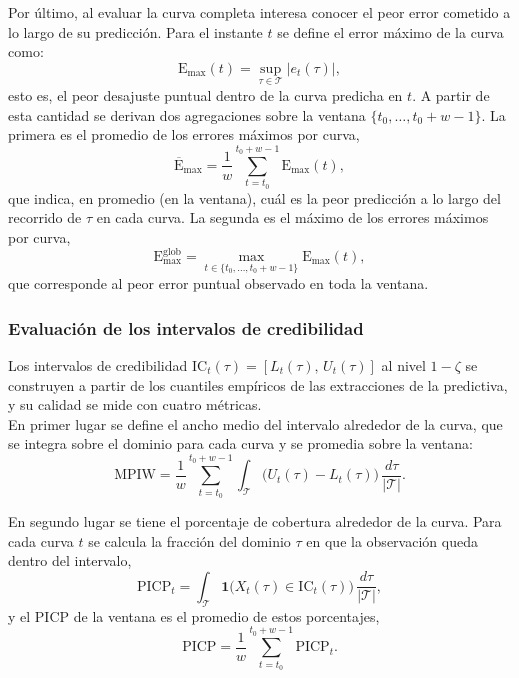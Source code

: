 Por último, al evaluar la curva completa interesa conocer el peor error cometido a lo largo de su predicción. Para el instante $t$ se define el error máximo de la curva como:
\begin{equation}
    \mathrm{E}_{\max}(t) = \sup_{\tau \in \mathcal{T}} \bigl|e_{t}(\tau)\bigr|,
\end{equation}
esto es, el peor desajuste puntual dentro de la curva predicha en $t$. A partir de esta cantidad se derivan dos agregaciones sobre la ventana $\{t_0, \dots, t_0+w-1\}$. La primera es el promedio de los errores máximos por curva,
\begin{equation}
    \overline{\mathrm{E}}_{\max} = \frac{1}{w}\sum_{t=t_0}^{t_0+w-1}
    \mathrm{E}_{\max}(t),
\end{equation}
que indica, en promedio (en la ventana), cuál es la peor predicción a lo largo del recorrido de $\tau$ en cada curva. La segunda es el máximo de los errores máximos por curva,
\begin{equation}
    \mathrm{E}_{\max}^{\mathrm{glob}} = \max_{t \in \{t_0, \dots, t_0+w-1\}}
    \mathrm{E}_{\max}(t),
\end{equation}
que corresponde al peor error puntual observado en toda la ventana.

\subsubsection{Evaluación de los intervalos de credibilidad}
\label{02_02_03_04_calibracion}
Los intervalos de credibilidad $\mathrm{IC}_t(\tau) =[L_t(\tau),\, U_t(\tau)]$ al nivel $1-\zeta$ se construyen a partir de los cuantiles empíricos de las extracciones de la predictiva, y su calidad se mide con cuatro métricas.\\

En primer lugar se define el ancho medio del intervalo alrededor de la curva, que se integra sobre el dominio para cada curva y se promedia sobre la ventana:
\begin{equation}
    \mathrm{MPIW} = \frac{1}{w}\sum_{t=t_0}^{t_0+w-1}
    \int_{\mathcal{T}} \bigl(U_t(\tau) - L_t(\tau)\bigr)
    \, \frac{d\tau}{|\mathcal{T}|}.
\end{equation}

En segundo lugar se tiene el porcentaje de cobertura alrededor de la curva. Para cada curva $t$ se calcula la fracción del dominio $\tau$ en que la observación queda dentro del intervalo,
\begin{equation}
    \mathrm{PICP}_t = \int_{\mathcal{T}}
    \mathbf{1}\bigl(X_t(\tau) \in \mathrm{IC}_t(\tau)\bigr)
    \, \frac{d\tau}{|\mathcal{T}|},
\end{equation}
y el PICP de la ventana es el promedio de estos porcentajes,
\begin{equation}
    \mathrm{PICP} = \frac{1}{w}\sum_{t=t_0}^{t_0+w-1} \mathrm{PICP}_t.
\end{equation}

